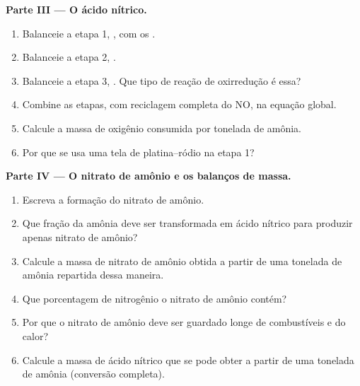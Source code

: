 \begin{problem}
\medskip
\noindent\textbf{Parte III --- O ácido nítrico.}
\begin{enumerate}[resume]
  \item Balanceie a etapa 1, , com os . %
  \item Balanceie a etapa 2, . %
  \item Balanceie a etapa 3, . Que tipo de %
        reação de oxirredução é essa?
  \item Combine as etapas, com reciclagem completa do NO, na equação
        global.
  \item Calcule a massa de oxigênio consumida por tonelada de amônia.
  \item Por que se usa uma tela de platina--ródio na etapa 1?
\end{enumerate}

\medskip
\noindent\textbf{Parte IV --- O nitrato de amônio e os balanços de massa.}
\begin{enumerate}[resume]
  \item Escreva a formação do nitrato de amônio.
  \item Que fração da amônia deve ser transformada em ácido nítrico para
        produzir apenas nitrato de amônio?
  \item Calcule a massa de nitrato de amônio obtida a partir de uma
        tonelada de amônia repartida dessa maneira.
  \item Que porcentagem de nitrogênio o nitrato de amônio contém?
  \item Por que o nitrato de amônio deve ser guardado longe de
        combustíveis e do calor?
  \item Calcule a massa de ácido nítrico que se pode obter a partir de
        uma tonelada de amônia (conversão completa).
\end{enumerate}
\end{problem}
